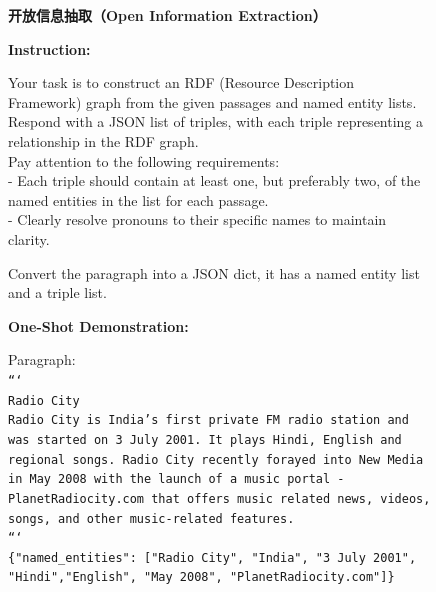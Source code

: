 \documentclass[11pt,UTF8,fontset=fandol]{ctexart}
\begin{document}
\begin{figure}[H]\centering
\begin{tcolorbox}[colback=white,colframe=black!55,boxrule=0.5pt,left=4pt,right=4pt,top=3pt,bottom=3pt,width=\linewidth]
\begin{center}\textbf{开放信息抽取（Open Information Extraction）}\end{center}
\small
\textbf{Instruction:}

Your task is to construct an RDF (Resource Description Framework) graph from the given passages and named entity lists. Respond with a JSON list of triples, with each triple representing a relationship in the RDF graph.\\
Pay attention to the following requirements:\\
- Each triple should contain at least one, but preferably two, of the named entities in the list for each passage.\\
- Clearly resolve pronouns to their specific names to maintain clarity.

Convert the paragraph into a JSON dict, it has a named entity list and a triple list.

\textbf{One-Shot Demonstration:}

Paragraph:\\
\texttt{```}\\
\texttt{Radio City}\\
\texttt{Radio City is India's first private FM radio station and was started on 3 July 2001. It plays Hindi, English and regional songs. Radio City recently forayed into New Media in May 2008 with the launch of a music portal - PlanetRadiocity.com that offers music related news, videos, songs, and other music-related features.}\\
\texttt{```}\\
\texttt{\{"named\_entities": ["Radio City", "India", "3 July 2001", "Hindi","English", "May 2008", "PlanetRadiocity.com"]\}}


\end{tcolorbox}
\end{figure}
\end{document}
